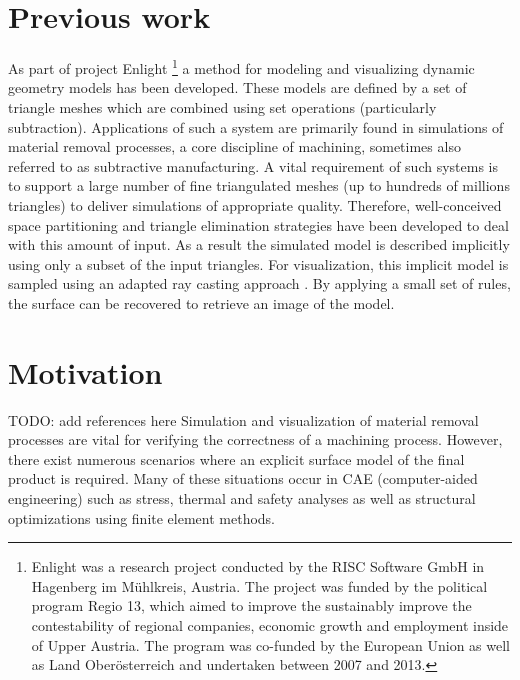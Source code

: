 

\section{Previous work}

As part of project Enlight
\footnote{
	Enlight was a research project conducted by the RISC Software GmbH in Hagenberg im M\"uhlkreis, Austria. The project was funded by the political program Regio 13, which aimed to improve the sustainably improve the contestability of regional companies, economic growth and employment inside of Upper Austria. The program was co-funded by the European Union as well as Land Ober\"osterreich and undertaken between 2007 and 2013.
}
a method for modeling and visualizing dynamic geometry models has been developed. These models are defined by a set of triangle meshes which are combined using set operations (particularly subtraction). Applications of such a system are primarily found in simulations of material removal processes, a core discipline of machining, sometimes also referred to as subtractive manufacturing. A vital requirement of such systems is to support a large number of fine triangulated meshes (up to hundreds of millions triangles) to deliver simulations of appropriate quality. Therefore, well-conceived space partitioning and triangle elimination strategies have been developed to deal with this amount of input. As a result the simulated model is described implicitly using only a subset of the input triangles. For visualization, this implicit model is sampled using an adapted ray casting approach \cite{enlight}. By applying a small set of rules, the surface can be recovered to retrieve an image of the model.


\section{Motivation}

TODO: add references here
Simulation and visualization of material removal processes are vital for verifying the correctness of a machining process. However, there exist numerous scenarios where an explicit surface model of the final product is required. Many of these situations occur in CAE (computer-aided engineering) such as stress, thermal and safety analyses as well as structural optimizations using finite element methods.




